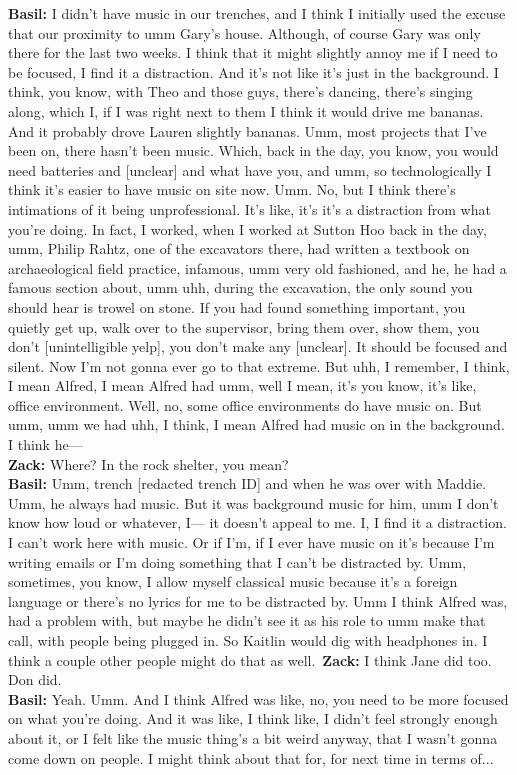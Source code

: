 \documentclass[
]{article}
\begin{document}
\textbf{Basil:} I didn't have music in our trenches, and I think I
initially used the excuse that our proximity to umm Gary's house.
Although, of course Gary was only there for the last two weeks. I think
that it might slightly annoy me if I need to be focused, I find it a
distraction. And it's not like it's just in the background. I think, you
know, with Theo and those guys, there's dancing, there's singing along,
which I, if I was right next to them I think it would drive me bananas.
And it probably drove Lauren slightly bananas. Umm, most projects that
I've been on, there hasn't been music. Which, back in the day, you know,
you would need batteries and {[}unclear{]} and what have you, and umm,
so technologically I think it's easier to have music on site now. Umm.
No, but I think there's intimations of it being unprofessional. It's
like, it's it's a distraction from what you're doing. In fact, I worked,
when I worked at Sutton Hoo back in the day, umm, Philip Rahtz, one of
the excavators there, had written a textbook on archaeological field
practice, infamous, umm very old fashioned, and he, he had a famous
section about, umm uhh, during the excavation, the only sound you should
hear is trowel on stone. If you had found something important, you
quietly get up, walk over to the supervisor, bring them over, show them,
you don't {[}unintelligible yelp{]}, you don't make any {[}unclear{]}.
It should be focused and silent. Now I'm not gonna ever go to that
extreme. But uhh, I remember, I think, I mean Alfred, I mean Alfred had
umm, well I mean, it's you know, it's like, office environment. Well,
no, some office environments do have music on. But umm, umm we had uhh,
I think, I mean Alfred had music on in the background. I think he---\\
\textbf{Zack:} Where? In the rock shelter, you mean?\\
\textbf{Basil:} Umm, trench {[}redacted trench ID{]} and when he was
over with Maddie. Umm, he always had music. But it was background music
for him, umm I don't know how loud or whatever, I--- it doesn't appeal
to me. I, I find it a distraction. I can't work here with music. Or if
I'm, if I ever have music on it's because I'm writing emails or I'm
doing something that I can't be distracted by. Umm, sometimes, you know,
I allow myself classical music because it's a foreign language or
there's no lyrics for me to be distracted by. Umm I think Alfred was,
had a problem with, but maybe he didn't see it as his role to umm make
that call, with people being plugged in. So Kaitlin would dig with
headphones in. I think a couple other people might do that as
well.~\textbf{Zack:} I think Jane did too. Don did.\\
\textbf{Basil:} Yeah. Umm. And I think Alfred was like, no, you need to
be more focused on what you're doing. And it was like, I think like, I
didn't feel strongly enough about it, or I felt like the music thing's a
bit weird anyway, that I wasn't gonna come down on people. I might think
about that for, for next time in terms of...
\end{document}
